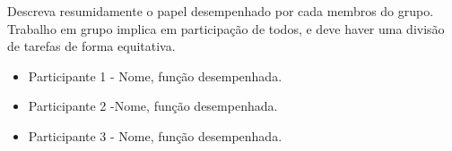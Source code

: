 Descreva resumidamente o papel desempenhado por cada membros do grupo. Trabalho em grupo implica em participação de todos, e deve haver uma divisão de tarefas de forma equitativa. 

\begin{itemize}
    \item Participante 1 - Nome, função desempenhada. 
    \item Participante 2 -Nome, função desempenhada.
    \item Participante 3 - Nome, função desempenhada.
\end{itemize}